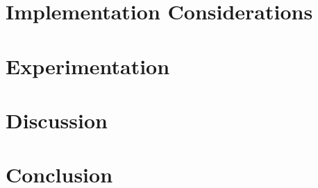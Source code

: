 \section{Implementation Considerations}
\label{s,perk,pract}

\section{Experimentation}
\label{s,perk,exp}

\section{Discussion}
\label{s,perk,disc}

\section{Conclusion}
\label{s,perk,conc}
